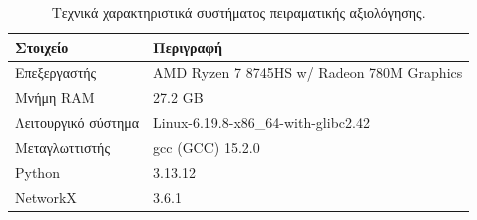 \begin{table}[h]
\centering
\caption{Τεχνικά χαρακτηριστικά συστήματος πειραματικής αξιολόγησης.}
\label{tab:system}
\begin{tabularx}{\textwidth}{lX}
\toprule
\textbf{Στοιχείο} & \textbf{Περιγραφή} \\
\midrule
  Επεξεργαστής & \textenglish{AMD Ryzen 7 8745HS w/ Radeon 780M Graphics} \\
  Μνήμη RAM & \textenglish{27.2 GB} \\
  Λειτουργικό σύστημα & \textenglish{Linux-6.19.8-x86\_64-with-glibc2.42} \\
  Μεταγλωττιστής & \textenglish{gcc (GCC) 15.2.0} \\
  \textenglish{Python} & \textenglish{3.13.12} \\
  \textenglish{NetworkX} & \textenglish{3.6.1} \\
\bottomrule
\end{tabularx}
\end{table}
